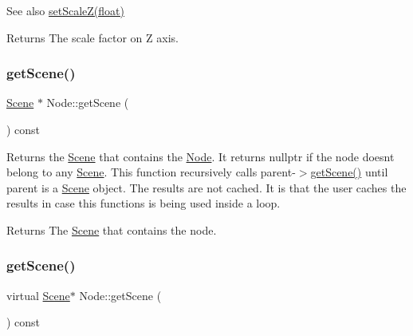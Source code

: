 \begin{DoxySeeAlso}{See also}
{\ttfamily \hyperlink{classNode_a79518b90226335e0997552687eb7b33f}{set\+Scale\+Z(float)}}
\end{DoxySeeAlso}
\begin{DoxyReturn}{Returns}
The scale factor on Z axis. 
\end{DoxyReturn}
\mbox{\label{classNode_a5a61a356773de436f80e55228ea01b66}} 
\subsubsection{\texorpdfstring{get\+Scene()}{getScene()}\hspace{0.1cm}{\footnotesize\ttfamily [1/2]}}
{\footnotesize\ttfamily \hyperlink{classScene}{Scene} $\ast$ Node\+::get\+Scene (\begin{DoxyParamCaption}{ }\end{DoxyParamCaption}) const\hspace{0.3cm}{\ttfamily [virtual]}}

Returns the \hyperlink{classScene}{Scene} that contains the \hyperlink{classNode}{Node}. It returns {\ttfamily nullptr} if the node doesn\textquotesingle{}t belong to any \hyperlink{classScene}{Scene}. This function recursively calls parent-\/$>$\hyperlink{classNode_a5a61a356773de436f80e55228ea01b66}{get\+Scene()} until parent is a \hyperlink{classScene}{Scene} object. The results are not cached. It is that the user caches the results in case this functions is being used inside a loop.

\begin{DoxyReturn}{Returns}
The \hyperlink{classScene}{Scene} that contains the node. 
\end{DoxyReturn}
\mbox{\label{classNode_adab0150253ebac47b36dfcdf8f8f8696}} 
\subsubsection{\texorpdfstring{get\+Scene()}{getScene()}\hspace{0.1cm}{\footnotesize\ttfamily [2/2]}}
{\footnotesize\ttfamily virtual \hyperlink{classScene}{Scene}$\ast$ Node\+::get\+Scene (\begin{DoxyParamCaption}{ }\end{DoxyParamCaption}) const\hspace{0.3cm}{\ttfamily [virtual]}}

